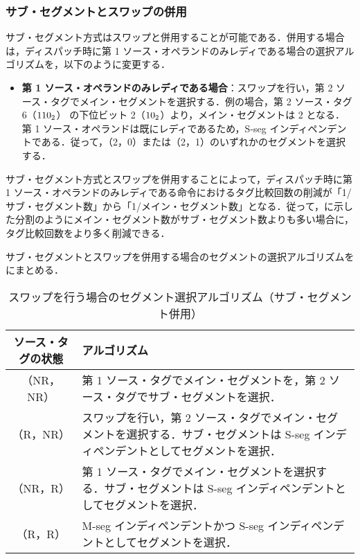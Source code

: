 \subsubsection{サブ・セグメントとスワップの併用}
サブ・セグメント方式はスワップと併用することが可能である．併用する場合は，ディスパッチ時に第 1 ソース・オペランドのみレディである場合の選択アルゴリズムを，以下のように変更する．
\begin{itemize}
  \item \textbf{第 1 ソース・オペランドのみレディである場合}：スワップを行い，第 2 ソース・タグでメイン・セグメントを選択する．例の場合，第 2 ソース・タグ 6（${\rm 110_2}$） の下位ビット 2（${\rm 10_2}$）より，メイン・セグメントは 2 となる．第 1 ソース・オペランドは既にレディであるため，S-seg インディペンデントである．従って，（2，0）または（2，1）のいずれかのセグメントを選択する．
\end{itemize}
サブ・セグメント方式とスワップを併用することによって，ディスパッチ時に第 1 ソース・オペランドのみレディである命令におけるタグ比較回数の削減が「1/サブ・セグメント数」から「1/メイン・セグメント数」となる．従って，に示した分割のようにメイン・セグメント数がサブ・セグメント数よりも多い場合に，タグ比較回数をより多く削減できる．

サブ・セグメントとスワップを併用する場合のセグメントの選択アルゴリズムをにまとめる．

\begin{table}[htb]
  \caption{スワップを行う場合のセグメント選択アルゴリズム（サブ・セグメント併用）}
  \footnotesize
  \center
   \begin{tabular}{|c|p{13cm}|} \hline \hline
    ソース・タグの状態 & アルゴリズム \\ \hline
    （NR，NR） & 第 1 ソース・タグでメイン・セグメントを，第 2 ソース・タグでサブ・セグメントを選択． \\ \hline
    （R，NR） & スワップを行い，第 2 ソース・タグでメイン・セグメントを選択する．サブ・セグメントは S-seg インディペンデントとしてセグメントを選択．\\ \hline
    （NR，R） & 第 1 ソース・タグでメイン・セグメントを選択する．サブ・セグメントは S-seg インディペンデントとしてセグメントを選択．\\ \hline
    （R，R） & M-seg インディペンデントかつ S-seg インディペンデントとしてセグメントを選択． \\ \hline
  \end{tabular}
  \label{tab:agg_algorithm_subseg}
\end{table}

